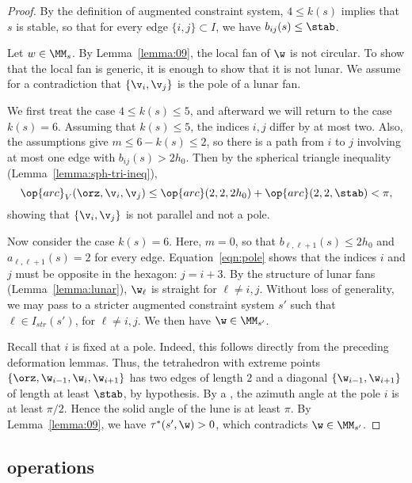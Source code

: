 \begin{proof}
By the definition of augmented constraint system, $4\le k(s)$ implies
that $s$ is stable, so that for every edge $\{i,j\}\subset I$, we have
$b_{i j}(s) \le\stab$.

Let $w\in \MM_s$.  By Lemma~\ref{lemma:09}, the local fan of $\w$  is not circular.
To show that the local fan is generic, it is enough to show that it is not lunar.
We assume for a contradiction that $\{\v_i,\v_j\}$ is the pole of a lunar fan.

We first treat the case  $4\le k(s)\le 5$,
and afterward we will return to the case $k(s)=6$. 
Assuming that  $k(s)\le 5$, the indices $i,j$ differ by at most two.
Also, the assumptions give $m\le 6-k(s)\le 2$, so there is a path from
$i$ to $j$ involving at most one edge with $b_{i j}(s)>2h_0$.
Then by the spherical triangle inequality (Lemma~\ref{lemma:sph-tri-ineq}),
\begin{equation}\label{eqn:pole}
\op{arc}_V(\orz,\v_i,\v_j) \le \op{arc}(2,2,2h_0) + \op{arc}(2,2,\stab) < \pi,
\end{equation}
showing that $\{\v_i,\v_j\}$ is not parallel and not a pole.

Now consider the case $k(s)=6$.  Here, $m=0$, so that $b_{\ell,\ell+1}(s)\le 2h_0$
and $a_{\ell,\ell+1}(s)=2$
for every edge. Equation~\ref{eqn:pole} shows that the indices $i$ and $j$
must be opposite in the hexagon: $j = i+3$.  By the structure of lunar fans
(Lemma~\ref{lemma:lunar}), $\w_\ell$ is straight for $\ell\ne i,j$.  Without
loss of generality, we may
pass to a stricter augmented constraint system $s'$ such that
$\ell\in I_{str}(s')$, for $\ell\ne i,j$.  We then have $\w\in \MM_{s'}$.

Recall that $i$ is fixed at a pole. 
  Indeed, this follows directly from the preceding deformation
lemmas.  Thus, the tetrahedron with extreme points
$\{\orz,\w_{i-1},\w_i,\w_{i+1}\}$ has two edges
of length $2$ and a diagonal $\{\w_{i-1},\w_{i+1}\}$ of length at least
$\stab$, by hypothesis.  By a , 
the azimuth angle at the pole $i$ is at least $\pi/2$.
Hence the solid angle of the lune is at least $\pi$.  By Lemma~\ref{lemma:09},
we have $\tau^*(s',\w)>0$, which contradicts $\w\in \MM_{s'}$.
\end{proof}



\subsection{operations}

